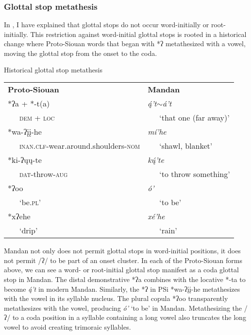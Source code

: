 \subsubsection{Glottal stop metathesis}\label{glottalstopmetathesis}

In , I have explained that glottal stops do not occur word-initially or root-initially. This restriction against word-initial glottal stops is rooted in a historical change where Proto-Siouan words that began with *ʔ metathesized with a vowel, moving the glottal stop from the onset to the coda.



\begin{exe}

\item\label{glottalchange} Historical glottal stop metathesis

\begin{tabular}{ll}
\textbf{Proto-Siouan}&
	\textbf{Mandan}\\
*ʔa + *-t(a)&	\textit{ą́'t}$\sim$\textit{á't}\\
	~~~\textsc{dem} + \textsc{loc}&~~~`that one (far away)'\\
*wa-ʔįį-he&	\textit{mí'he}\\
	~~~\textsc{inan.clf}-wear.around.shoulders-\textsc{nom}&
	~~~`shawl, blanket'\\
*ki-ʔųų-te&\textit{kų́'te}\\
~~~\textsc{dat}-throw-\textsc{aug}&~~~`to throw something'\\
*ʔoo&	\textit{ó'}\\
	~~~`be.\textsc{pl}'&~~~`to be'\\
*xʔehe&	\textit{xé'he}\\
	~~~`drip'& 	~~~`rain'\\
\end{tabular}

\end{exe}

Mandan not only does not permit glottal stops in word-initial positions, it does not permit /ʔ/ to be part of an onset cluster.  In each of the Proto-Siouan forms above, we can see a word- or root-initial glottal stop manifest as a coda glottal stop in Mandan. The distal demonstrative *ʔa combines with the locative *-ta to become \textit{ą́'t} in modern Mandan. Similarly, the *ʔ in PSi *wa-ʔįį-he metathesizes with the vowel in its syllable nucleus. The plural copula *ʔoo transparently metathesizes with the vowel, producing \textit{ó'} `to be' in Mandan. Metathesizing the /ʔ/ to a coda position in a syllable containing a long vowel also truncates the long vowel to avoid creating trimoraic syllables.

